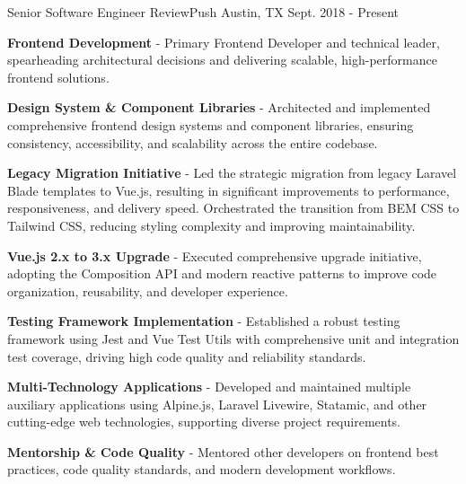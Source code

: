 \begin{cventries}
    \cventry
    {Senior Software Engineer} %
    {ReviewPush} %
    {Austin, TX} %
    {Sept. 2018 - Present} %
    {
        \vspace{-4mm}
        \begin{cvitems} %
            \item {\textbf{Frontend Development} - Primary Frontend Developer and technical leader, spearheading architectural decisions and delivering scalable, high-performance frontend solutions.}
        \end{cvitems}
        \begin{cvsubitems}
            \item {\textbf{Design System \& Component Libraries} - Architected and implemented comprehensive frontend design systems and component libraries, ensuring consistency, accessibility, and scalability across the entire codebase.}
            \item {\textbf{Legacy Migration Initiative} - Led the strategic migration from legacy Laravel Blade templates to Vue.js, resulting in significant improvements to performance, responsiveness, and delivery speed. Orchestrated the transition from BEM CSS to Tailwind CSS, reducing styling complexity and improving maintainability.}
            \item {\textbf{Vue.js 2.x to 3.x Upgrade} - Executed comprehensive upgrade initiative, adopting the Composition API and modern reactive patterns to improve code organization, reusability, and developer experience.}
            \item {\textbf{Testing Framework Implementation} - Established a robust testing framework using Jest and Vue Test Utils with comprehensive unit and integration test coverage, driving high code quality and reliability standards.}
            \item {\textbf{Multi-Technology Applications} - Developed and maintained multiple auxiliary applications using Alpine.js, Laravel Livewire, Statamic, and other cutting-edge web technologies, supporting diverse project requirements.}
            \item {\textbf{Mentorship \& Code Quality} - Mentored other developers on frontend best practices, code quality standards, and modern development workflows.}
        \end{cvsubitems}
        \begin{cvitems} %

\end{cvitems}}
\end{cventries}
